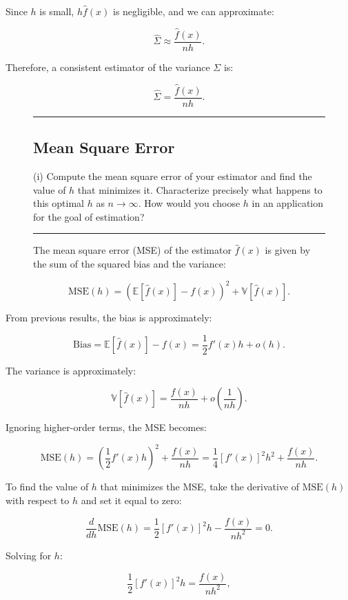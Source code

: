 \documentclass{article}
\newenvironment{colorparagraph}[1]{\par\color{#1}}{\par}
\begin{document}
Since \( h \) is small, \( h \hat{f}(x) \) is negligible, and we can approximate:

\[
\hat{\Sigma} \approx \frac{\hat{f}(x)}{n h}.
\]

Therefore, a consistent estimator of the variance \( \Sigma \) is:

\[
\hat{\Sigma} = \frac{\hat{f}(x)}{n h}.
\]

\begin{figure}[H]
\begin{colorparagraph}{questioncolor}
\label{q2i}
\rule{\textwidth}{0.5pt}
\subsection{Mean Square Error}
(i) Compute the mean square error of your estimator and find the value of \( h \) that minimizes it. Characterize precisely what happens to this optimal \( h \) as \( n \to \infty \). How would you choose \( h \) in an application for the goal of estimation?

\rule{\textwidth}{0.5pt}
\end{colorparagraph}

The mean square error (MSE) of the estimator \( \hat{f}(x) \) is given by the sum of the squared bias and the variance:
\end{figure}

\[
\text{MSE}(h) = \left( \mathbb{E}[\hat{f}(x)] - f(x) \right)^2 + \mathbb{V}[\hat{f}(x)].
\]

From previous results, the bias is approximately:

\[
\text{Bias} = \mathbb{E}[\hat{f}(x)] - f(x) = \frac{1}{2} f'(x) h + o(h).
\]

The variance is approximately:

\[
\mathbb{V}[\hat{f}(x)] = \frac{f(x)}{n h} + o\left( \frac{1}{n h} \right).
\]

Ignoring higher-order terms, the MSE becomes:

\[
\text{MSE}(h) = \left( \frac{1}{2} f'(x) h \right)^2 + \frac{f(x)}{n h} = \frac{1}{4} [f'(x)]^2 h^2 + \frac{f(x)}{n h}.
\]

To find the value of \( h \) that minimizes the MSE, take the derivative of \( \text{MSE}(h) \) with respect to \( h \) and set it equal to zero:

\[
\frac{d}{d h} \text{MSE}(h) = \frac{1}{2} [f'(x)]^2 h - \frac{f(x)}{n h^2} = 0.
\]

Solving for \( h \):

\[
\frac{1}{2} [f'(x)]^2 h = \frac{f(x)}{n h^2},
\]
\end{document}
